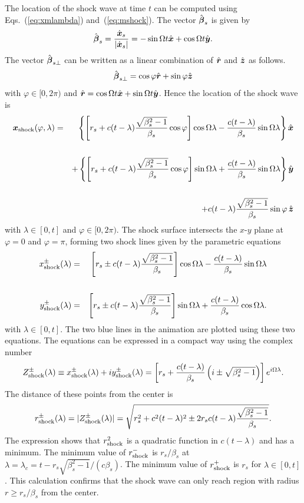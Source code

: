 \documentclass[12pt]{article}
\newcommand \beq {\begin{equation}}
\newcommand \eeq {\end{equation}}
\newcommand \beqn {\begin{eqnarray}}
\newcommand \eeqn {\end{eqnarray}}
\newcommand{\ve}[1]{\mbox{\boldmath $#1$}}
\begin{document}
The location of the shock wave at time $t$ can be computed using Eqs.~(\ref{eq:xmlambda}) 
and~(\ref{eq:mshock}). The vector $\hat{\ve{\beta}}_s$ is given by 
\beq
  \hat{\ve{\beta}}_s = \frac{\dot{\ve{x}}_s}{|\dot{\ve{x}}_s|} 
= -\sin \Omega t \hat{\ve{x}} + \cos \Omega t \hat{\ve{y}} .
\eeq
The vector $\hat{\ve{\beta}}_{s \perp}$ can be written as a linear 
combination of $\hat{\ve{r}}$ and $\hat{\ve{z}}$ as follows.
\beq
  \hat{\ve{\beta}}_{s \perp} = \cos \varphi \hat{\ve{r}} +\sin \varphi \hat{\ve{z}}
\eeq
with $\varphi \in [0,2\pi)$ and $\hat{\ve{r}}=\cos \Omega t \hat{\ve{x}} + \sin \Omega t 
\hat{\ve{y}}$. Hence the location of the shock wave is 
\beqn
  \ve{x}_{\rm shock}(\varphi,\lambda) &=& 
\left\{ \left[ r_s + c(t-\lambda)\frac{\sqrt{\beta_s^2-1}}{\beta_s}\cos\varphi\right]
\cos \Omega \lambda - \frac{c(t-\lambda)}{\beta_s}\sin \Omega \lambda\right \} \hat{\ve{x}} \cr \cr 
&&+ \left\{ \left[ r_s + c(t-\lambda)\frac{\sqrt{\beta_s^2-1}}{\beta_s}\cos\varphi\right]
\sin \Omega \lambda + \frac{c(t-\lambda)}{\beta_s}\sin \Omega \lambda\right \} \hat{\ve{y}} \cr \cr 
&&+ c(t-\lambda)\frac{\sqrt{\beta_s^2-1}}{\beta_s} \sin \varphi \, \hat{\ve{z}} 
\eeqn
with $\lambda \in [0,t]$ and $\varphi \in [0,2\pi)$.
The shock surface intersects the $x$-$y$ plane at $\varphi=0$ and $\varphi=\pi$, forming 
two shock lines given by the parametric equations
\beqn
  x_{\rm shock}^{\pm}(\lambda) &=& \left[ r_s \pm c(t-\lambda)\frac{\sqrt{\beta_s^2-1}}{\beta_s}
\right] \cos \Omega \lambda - \frac{c(t-\lambda)}{\beta_s}\sin \Omega \lambda \\ \cr 
  y_{\rm shock}^{\pm}(\lambda) &=& \left[ r_s \pm c(t-\lambda)\frac{\sqrt{\beta_s^2-1}}{\beta_s}
\right] \sin \Omega \lambda + \frac{c(t-\lambda)}{\beta_s}\cos \Omega \lambda .
\eeqn
with $\lambda \in [0,t]$. The two blue lines in the animation are plotted 
using these two equations. The equations can be expressed in a compact way 
using the complex number 
\beq
  Z_{\rm shock}^{\pm}(\lambda) \equiv x_{\rm shock}^{\pm}(\lambda) + iy_{\rm shock}^{\pm}(\lambda) 
= \left[ r_s + \frac{c(t-\lambda)}{\beta_s}
\left(i \pm \sqrt{\beta_s^2-1}\right)\right] e^{i \Omega \lambda} .
\eeq
The distance of these points from the center is 
\beq
  r_{\rm shock}^{\pm}(\lambda) = |Z_{\rm shock}^{\pm}(\lambda)| 
= \sqrt{r_s^2 + c^2(t-\lambda)^2 \pm 2r_s c(t-\lambda) \frac{\sqrt{\beta_s^2-1}}{\beta_s}} .
\eeq
The expression shows that $r_{\rm shock}^2$ is a quadratic function in $c(t-\lambda)$ and 
has a minimum. The minimum value of $r_{\rm shock}^-$ is $r_s/\beta_s$ at 
$\lambda = \lambda_c=t - r_s\sqrt{\beta_s^2-1}/(c\beta_s)$. The minimum value of 
$r_{\rm shock}^+$ is $r_s$ for $\lambda \in [0,t]$. This calculation 
confirms that the shock wave can only 
reach region with radius $r \geq r_s/\beta_s$ from the center.
\end{document}
